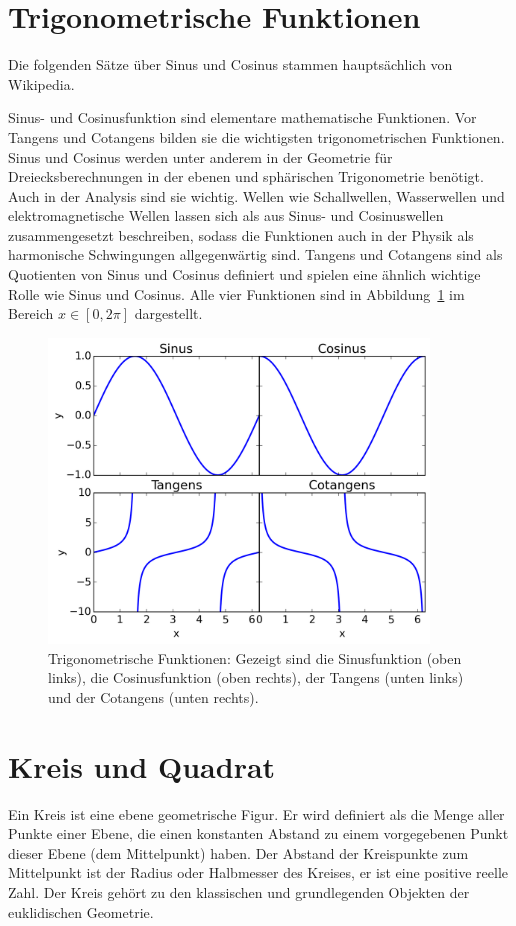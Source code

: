 \documentclass[12pt,a4paper,bibtotoc]{scrreprt}
\begin{document}
\section{Trigonometrische Funktionen}
\label{sec:trigo_funk}
Die folgenden Sätze über Sinus und Cosinus stammen hauptsächlich
von Wikipedia.

Sinus- und Cosinusfunktion sind elementare mathematische Funktionen.
Vor Tangens und Cotangens bilden sie die wichtigsten trigonometrischen
Funktionen. Sinus und Cosinus werden unter anderem in der Geometrie
für Dreiecksberechnungen in der ebenen und sphärischen Trigonometrie
benötigt. Auch in der Analysis sind sie wichtig. Wellen wie
Schallwellen, Wasserwellen und elektromagnetische Wellen lassen sich
als aus Sinus- und Cosinuswellen zusammengesetzt beschreiben, sodass
die Funktionen auch in der Physik als harmonische Schwingungen
allgegenwärtig sind. Tangens und Cotangens sind als Quotienten von
Sinus und Cosinus definiert und spielen eine ähnlich wichtige Rolle
wie Sinus und Cosinus. Alle vier Funktionen sind in
Abbildung~\ref{fig:trigo_funk} im Bereich $x\in[0, 2\pi]$ dargestellt.
%
\begin{figure}[ht]
  \centering
  \includegraphics[width=0.9\textwidth]{trigo_funktionen}
  \caption{Trigonometrische Funktionen: Gezeigt sind die Sinusfunktion
    (oben links), die Cosinusfunktion (oben rechts), der Tangens
    (unten links) und der Cotangens (unten rechts).}
  \label{fig:trigo_funk}
\end{figure}
%
\section{Kreis und Quadrat}
Ein Kreis ist eine ebene geometrische Figur. Er wird definiert als die
Menge aller Punkte einer Ebene, die einen konstanten Abstand zu einem
vorgegebenen Punkt dieser Ebene (dem Mittelpunkt) haben. Der Abstand
der Kreispunkte zum Mittelpunkt ist der Radius oder Halbmesser des
Kreises, er ist eine positive reelle Zahl. Der Kreis gehört zu den
klassischen und grundlegenden Objekten der euklidischen Geometrie.
\end{document}
